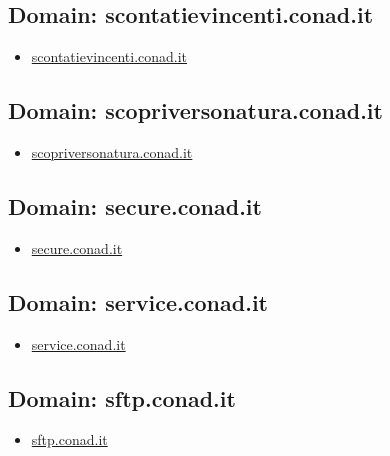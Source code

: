 \documentclass{article}
\begin{document}
    \subsection{Domain: scontatievincenti.conad.it}
    \begin{itemize}
        
            
            \item \href{ https://scontatievincenti.conad.it/}{ scontatievincenti.conad.it }
            
        
    \end{itemize}

    \subsection{Domain: scopriversonatura.conad.it}
    \begin{itemize}
        
            
            \item \href{ https://www.scopriversonatura.conad.it/}{ scopriversonatura.conad.it }
            
        
    \end{itemize}

    \subsection{Domain: secure.conad.it}
    \begin{itemize}
        
            
            \item \href{ http://secure.conad.it/}{ secure.conad.it }
            
        
    \end{itemize}

    \subsection{Domain: service.conad.it}
    \begin{itemize}
        
            
            \item \href{ http://service.conad.it}{ service.conad.it }
            
        
    \end{itemize}

    \subsection{Domain: sftp.conad.it}
    \begin{itemize}
        
            
            \item \href{ http://sftp.conad.it}{ sftp.conad.it }
            
        
    \end{itemize}
\end{document}
